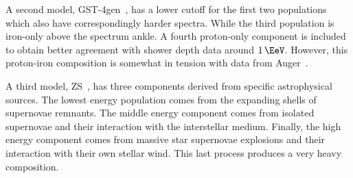 A second model, GST-4gen~\cite{Gaisser:2013bla}, has a lower cutoff for the first two populations which also have correspondingly harder spectra.
While the third population is iron-only above the spectrum ankle.
A fourth proton-only component is included to obtain better agreement with shower depth data around $\SI{1}\EeV$.
However, this proton-iron composition is somewhat in tension with data from Auger~\cite{Abraham:2010yv, Aab:2014aea}.

A third model, ZS~\cite{Zatsepin:2006ci}, has three components derived from specific astrophysical sources.
The lowest energy population comes from the expanding shells of supernovae remnants.
The middle energy component comes from isolated supernovae and their interaction with the interstellar medium.
Finally, the high energy component comes from massive star supernovae explosions and their interaction with their own stellar wind.
This last process produces a very heavy composition.

